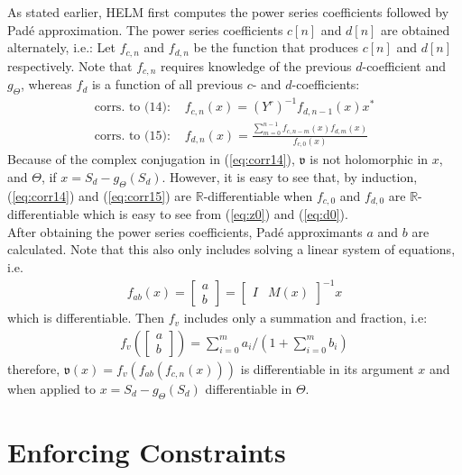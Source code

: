 As stated earlier, HELM first computes the power series coefficients followed by Pad\'e approximation. The power series coefficients $c[n]$ and $d[n]$ are obtained alternately, i.e.: Let $f_{c,n}$ and $f_{d,n}$ be the function that produces $c[n]$ and $d[n]$ respectively. Note that $f_{c,n}$ requires knowledge of the previous $d$-coefficient and $g_\Theta$, whereas $f_d$ is a function of all previous $c$- and $d$-coefficients:
\begin{align}
\text{corrs. to (14): } & f_{c,n}(x)  = (Y^r)^{-1}f_{d,n-1}(x)x^* \label{eq:corr14}\\
\text{corrs. to (15): } & f_{d,n}(x)  = \frac{\sum_{m=0}^{n-1} f_{c,n-m}(x)f_{d,m}(x)}{f_{c,0}(x)} \label{eq:corr15}
\end{align}
Because of the complex conjugation in (\ref{eq:corr14}), $\mathfrak{v}$ is not holomorphic in $x$, and $\Theta$, if $x = S_d-g_\Theta(S_d)$. However, it is easy to see that, by induction, (\ref{eq:corr14}) and (\ref{eq:corr15}) are $\mathbb{R}$-differentiable when $f_{c,0}$ and $f_{d,0}$ are $\mathbb{R}$-differentiable which is easy to see from (\ref{eq:z0}) and (\ref{eq:d0}).\\
After obtaining the power series coefficients, Pad\'e approximants $a$ and $b$ are calculated. Note that this also only includes solving a linear system of equations, i.e. \begin{align*}
f_{ab}(x) = \begin{bmatrix}a\\ b\end{bmatrix} = \begin{bmatrix}I & M(x)\end{bmatrix}^{-1}  x
\end{align*} which is differentiable. Then $f_v$ includes only a summation and fraction, i.e:
\begin{align*}
f_v(\begin{bmatrix}a\\ b\end{bmatrix}) = \sum_{i=0}^m a_i / (1+\sum_{i=0}^m b_i)
\end{align*}
therefore, $\mathfrak{v}(x) = f_v(f_{ab}(f_{c,n}(x)))$ is differentiable in its argument $x$ and when applied to $x = S_d-g_\Theta(S_d)$ differentiable in $\Theta$.

\section{Enforcing Constraints}
\label{sec:constraints}
